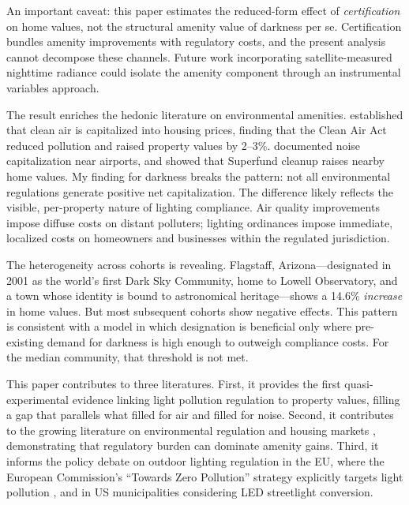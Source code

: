 \documentclass[12pt]{article}
\begin{document}
An important caveat: this paper estimates the reduced-form effect of \textit{certification} on home values, not the structural amenity value of darkness per se. Certification bundles amenity improvements with regulatory costs, and the present analysis cannot decompose these channels. Future work incorporating satellite-measured nighttime radiance could isolate the amenity component through an instrumental variables approach.

The result enriches the hedonic literature on environmental amenities. \citet{chay2005does} established that clean air is capitalized into housing prices, finding that the Clean Air Act reduced pollution and raised property values by 2--3\%. \citet{pope2008noise} documented noise capitalization near airports, and \citet{greenstone2009identifying} showed that Superfund cleanup raises nearby home values. My finding for darkness breaks the pattern: not all environmental regulations generate positive net capitalization. The difference likely reflects the visible, per-property nature of lighting compliance. Air quality improvements impose diffuse costs on distant polluters; lighting ordinances impose immediate, localized costs on homeowners and businesses within the regulated jurisdiction.

The heterogeneity across cohorts is revealing. Flagstaff, Arizona---designated in 2001 as the world's first Dark Sky Community, home to Lowell Observatory, and a town whose identity is bound to astronomical heritage---shows a 14.6\% \textit{increase} in home values. But most subsequent cohorts show negative effects. This pattern is consistent with a model in which designation is beneficial only where pre-existing demand for darkness is high enough to outweigh compliance costs. For the median community, that threshold is not met.

This paper contributes to three literatures. First, it provides the first quasi-experimental evidence linking light pollution regulation to property values, filling a gap that parallels what \citet{chay2005does} filled for air and \citet{pope2008noise} filled for noise. Second, it contributes to the growing literature on environmental regulation and housing markets \citep{gamper2020impacts, muehlenbachs2015shale, currie2015environmental}, demonstrating that regulatory burden can dominate amenity gains. Third, it informs the policy debate on outdoor lighting regulation in the EU, where the European Commission's ``Towards Zero Pollution'' strategy explicitly targets light pollution \citep{eu2021zero}, and in US municipalities considering LED streetlight conversion.
\end{document}
